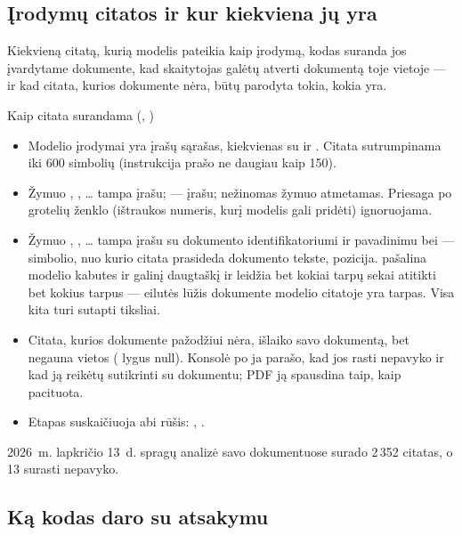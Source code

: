 \subsection{Įrodymų citatos ir kur kiekviena jų yra}

Kiekvieną citatą, kurią modelis pateikia kaip įrodymą, kodas suranda jos įvardytame dokumente,
kad skaitytojas galėtų atverti dokumentą toje vietoje --- ir kad citata, kurios dokumente nėra,
būtų parodyta tokia, kokia yra.

\begin{codebox}{Kaip citata surandama (, )}
\begin{itemize}
  \item Modelio įrodymai yra įrašų sąrašas, kiekvienas su  ir . Citata
    sutrumpinama iki 600 simbolių (instrukcija prašo ne daugiau kaip 150).
  \item Žymuo , , \ldots{} tampa  įrašu;  ---
     įrašu; nežinomas žymuo atmetamas. Priesaga po grotelių ženklo (ištraukos
    numeris, kurį modelis gali pridėti) ignoruojama.
  \item Žymuo , , \ldots{} tampa  įrašu su dokumento
    identifikatoriumi ir pavadinimu bei  --- simbolio, nuo kurio citata prasideda
    dokumento tekste, pozicija.  pašalina modelio kabutes ir galinį
    daugtaškį ir leidžia bet kokiai tarpų sekai atitikti bet kokius tarpus --- eilutės lūžis
    dokumente modelio citatoje yra tarpas. Visa kita turi sutapti tiksliai.
  \item Citata, kurios dokumente pažodžiui nėra, išlaiko savo dokumentą, bet negauna vietos
    ( lygus null). Konsolė po ja parašo, kad jos rasti nepavyko ir kad ją reikėtų
    sutikrinti su dokumentu; PDF ją spausdina taip, kaip pacituota.
  \item Etapas suskaičiuoja abi rūšis: , .
\end{itemize}
\end{codebox}

2026~m. lapkričio 13~d. spragų analizė savo dokumentuose surado 2\,352 citatas, o 13 surasti
nepavyko.

\subsection{Ką kodas daro su atsakymu}

